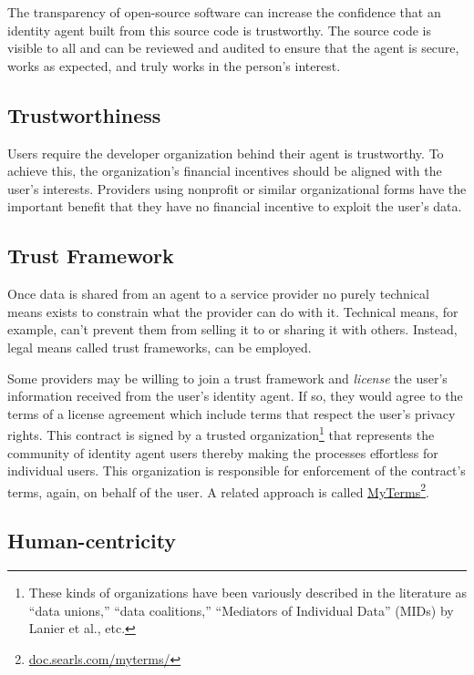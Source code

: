 \documentclass[11pt, oneside]{article}   	%
\newcommand{\hyperfootnote}[1][]{\def\ArgI{{#1}}\hyperfootnoteRelay}
\newcommand\hyperfootnoteRelay[2][]{\href{#1#2}{\ArgI}\footnote{\href{#1#2}{#2}}}
\begin{document}
The transparency of open-source software can increase the confidence that an identity agent built from this source code is trustworthy. The source code is visible to all and can be reviewed and audited to ensure that the agent is secure, works as expected, and truly works in the person's interest.

\subsection{Trustworthiness}

Users require the developer organization behind their agent is trustworthy. To achieve this, the organization's financial incentives should be aligned with the user's interests. Providers using nonprofit or similar organizational forms have the important benefit that they have no financial incentive to exploit the user's data. 

\subsection{Trust Framework}

Once data is shared from an agent to a service provider no purely technical means exists to constrain what the provider can do with it. Technical means, for example, can't prevent them from selling it to or sharing it with others. Instead, legal means called trust frameworks, can be employed. 

Some providers may be willing to join a trust framework and \emph{license} the user's information received from the user's identity agent. If so, they would agree to the terms of a license agreement which include terms that respect the user's privacy rights. This contract is signed by a trusted organization\footnote{These kinds of organizations have been variously described in the literature as ``data unions,'' ``data coalitions,'' ``Mediators of Individual Data'' (MIDs) by Lanier et al.\cite{Lanier2018}, etc.} that represents the community of identity agent users thereby making the processes effortless for individual users. This organization is responsible for enforcement of the contract's terms, again, on behalf of the user. A related approach is called \hyperfootnote[MyTerms][https://]{doc.searls.com/myterms/}.

\subsection{Human-centricity}
\end{document}
